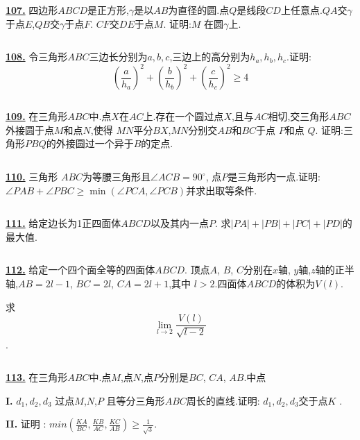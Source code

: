 \documentclass{article}
\begin{document}
\href{ http://www.artofproblemsolving.com/Forum/viewtopic.php?p=220569#p220569
}{\bf 107.} 四边形$ABCD$是正方形,$\gamma$是以$AB$为直径的圆.点$Q$是线段$CD$上任意点.$QA$交$\gamma$于点$E$,$QB$交$\gamma$于点$F.$ $CF$交$DE$于点$M.$ 证明:$M$ 在圆$\gamma$上.


$$ $$


\href{ http://www.artofproblemsolving.com/Forum/viewtopic.php?p=278616#p278616
}{\bf 108.} 令三角形$ABC$三边长分别为$a,b,c$,三边上的高分别为$h_a, h_b, h_c$.证明:$$(\frac{a}{h_a})^2+(\frac{b}{h_b})^2+(\frac{c}{h_c})^2 \geq 4$$


$$ $$


\href{http://www.artofproblemsolving.com/Forum/viewtopic.php?p=135082#p135082
 }{\bf 109.} 在三角形$ABC$中.点$X$在$AC$上.存在一个圆过点$X$,且与$AC$相切,交三角形$ABC$外接圆于点$M$和点$N$,使得 $MN$平分$BX$,$MN$分别交$AB$和$BC$于点 $P$和点 $Q$. 证明:三角形$PBQ$的外接圆过一个异于$B$的定点.


$$ $$


\href{ http://www.artofproblemsolving.com/Forum/viewtopic.php?p=159507#p159507
}{\bf 110.} 三角形 $ABC$为等腰三角形且$\angle ACB=90^{\circ}$, 点$P$是三角形内一点.证明: $\angle PAB+\angle PBC\ge\min(\angle PCA,\angle PCB)$并求出取等条件.



$$ $$


\href{ http://www.artofproblemsolving.com/Forum/viewtopic.php?p=117329#p117329
}{\bf 111.} 给定边长为1正四面体$ABCD$以及其内一点$P$.
求$\left|PA\right|+\left|PB\right|+\left|PC\right|+\left|PD\right|$的最大值.


$$ $$


\href{ http://www.artofproblemsolving.com/Forum/viewtopic.php?p=134422#p134422
}{\bf 112.} 给定一个四个面全等的四面体$ABCD$. 顶点$A$, $B$, $C$分别在$x$轴, $y$轴,$z$轴的正半轴,$AB=2l-1$, $BC=2l$, $CA=2l+1$,其中 $l>2$.四面体$ABCD$的体积为$V\left(l\right)$.

求$$\lim_{l\to 2} \frac{V\left(l\right)}{\sqrt{l-2}}$$.


$$ $$


\href{http://www.artofproblemsolving.com/Forum/viewtopic.php?p=134462#p134462
 }{\bf 113.} 在三角形$ABC$中.点$M$,点$N$,点$P$分别是$BC$, $CA$, $AB$.中点
 
{\bf I.} $d_1, d_2, d_3$ 过点$M$,$N$,$P$ 且等分三角形$ABC$周长的直线.证明: $d_1, d_2, d_3$交于点$K$ .

{\bf II.} 证明 :  $\displaystyle min(\frac{KA}{BC}, \frac{KB}{AC}, \frac{KC}{AB}) \geq \frac{1}{\sqrt3}$.
\end{document}
